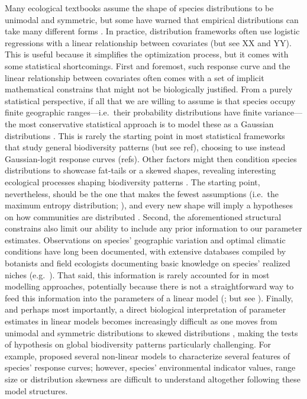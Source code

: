 \documentclass[11pt, a4paper]{article}
\begin{document}
Many ecological textbooks \citep{krebsEcologyExperimentalAnalysis1972} assume the shape of species distributions to be unimodal and symmetric, but some have warned that empirical distributions can take many different forms \citep{austinModelsAnalysisSpecies1987, austin2002spatial}. In practice, distribution frameworks often use logistic regressions with a linear relationship between covariates (but see XX and YY). This is useful because it simplifies the optimization process, but it comes with some statistical shortcomings. First and foremost, such response curve and the linear relationship between covariates often comes with a set of implicit mathematical constrains that might not be biologically justified. From a purely statistical perspective, if all that we are willing to assume is that species occupy finite geographic ranges---i.e.~their probability distributions have finite variance---the most conservative statistical approach is to model these as a Gaussian distributions \citep{frankCommonPatternsNature2009}. This is rarely the starting point in most statistical frameworks that study general biodiversity patterns (but see ref), choosing to use instead Gaussian-logit response curves (refs). Other factors might then condition species distributions to showcase fat-tails or a skewed shapes, revealing interesting ecological processes shaping biodiversity patterns \citep{austinNonlinearSpeciesResponse1976, minchinEvaluationRelativeRobustness1987}. The starting point, nevertheless, should be the one that makes the fewest assumptions (i.e.~the maximum entropy distribution; \citealt{frankCommonPatternsNature2009}), and every new shape will imply a hypotheses on how communities are distributed \citep{damenSpatialPredictionsCommunity2017}. Second, the aforementioned structural constrains also limit our ability to include any prior information to our parameter estimates. Observations on species' geographic variation and optimal climatic conditions have long been documented, with extensive databases compiled by botanists and field ecologists documenting basic knowledge on species' realized niches (e.g.~\citealt{landoltFloraIndicativaOkologische2010}). That said, this information is rarely accounted for in most modelling approaches, potentially because there is not a straightforward way to feed this information into the parameters of a linear model (\citealt{scherrerEcologicalIndicatorValues2019}; but see \citealt{terbraakWeightedAveragingLogistic1986}). Finally, and perhaps most importantly, a direct biological interpretation of parameter estimates in linear models becomes increasingly difficult as one moves from unimodal and symmetric distributions \citep{terbraakWeightedAveragingLogistic1986, jamilGeneralizedLinearMixed2013} to skewed distributions \citep{huismanHierarchicalSetModels1993}, making the tests of hypothesis on global biodiversity patterns particularly challenging. For example, \citet{huismanHierarchicalSetModels1993} proposed several non-linear models to characterize several features of species' response curves; however, species' environmental indicator values, range size or distribution skewness are difficult to understand altogether following these model structures.
\end{document}
